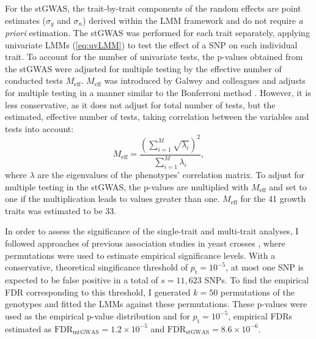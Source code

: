 For the stGWAS, the trait-by-trait components of the random effects are point estimates (\(\sigma_g\) and \(\sigma_n\)) derived within the LMM framework and do not require \textit{a priori} estimation. The stGWAS was performed for each trait separately, applying univariate LMMs (\cref{eq:uvLMM}) to test the effect of a SNP on each individual trait. To account for the number of univariate tests, the p-values obtained from the stGWAS were adjusted for multiple testing by the effective number of conducted tests \(M_\text{eff}\). \(M_\text{eff}\) was introduced by Galwey and colleagues \citeyear{Galwey2009} and adjusts for multiple testing in a manner similar to the Bonferroni method \citep{Dunn1961}. However, it is less conservative, as it does not adjust for total number of tests, but the estimated, effective number of tests, taking correlation between the 
variables and tests into account:
\begin{equation}
 M_\text{eff} = \frac{(\sum^M_{i=1} \sqrt{\lambda_i})^2}{\sum^M_{i=1}\lambda_i},
 \label{eq:meff}
\end{equation}
 where \(\lambda\) are the eigenvalues of the phenotypes' correlation matrix. To adjust for multiple testing in the stGWAS, the p-values are multiplied with \(M_\text{eff}\) and set to one if the multiplication leads to values greater than one. \(M_\text{eff}\) for the \num{41} growth traits was estimated to be \num{33}. 
 
In order to assess the significance of the single-trait and multi-trait analyses, I followed approaches of previous association studies in yeast crosses \citep{Brem2002,Brem2005,Ehrenreich2010}, where permutations were used to estimate empirical significance levels. With a conservative, theoretical singificance threshold of \(p_\text{t}=10^{-5}\), at most one SNP is expected to be false positive in a total of \(s = 11,623\) SNPs. To find the empirical FDR corresponding to this threshold, I generated \(k = 50\) permutations of the genotypes and fitted the LMMs against these permutations. These p-values were used as the empirical p-value distribution and for \(p_\text{t}=10^{-5}\), empirical FDRs estimated as 
\(\text{FDR}_{\text{mtGWAS}} =1.2 \times 10^{-5}\) and \(\text{FDR}_{\text{stGWAS}} =8.6 \times 10^{-6}\).

